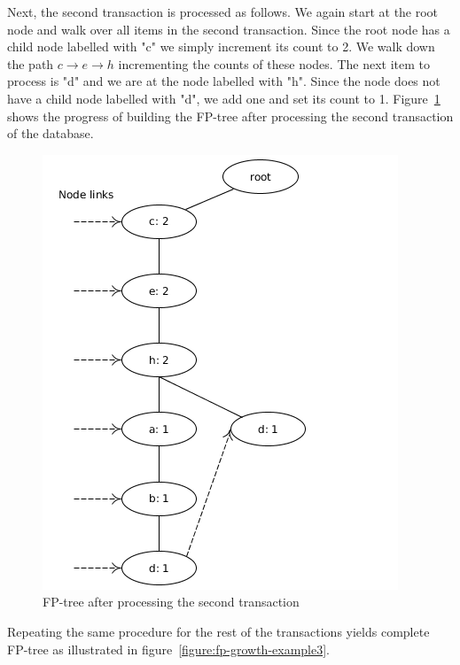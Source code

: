 Next, the second transaction is processed as follows. We again start at the root node and walk over all items in the second transaction. Since the root node has a child node labelled with "c" we simply increment its count to 2. We walk down the path $c \rightarrow e \rightarrow h$ incrementing the counts of these nodes. The next  item to process is "d" and we are at the node labelled with "h". Since the node does not have a child node labelled with "d", we add one and set its count to 1. Figure~\ref{figure:fp-growth-example2} shows the progress of building the FP-tree after processing the second transaction of the database.

\begin{figure}[h]
	\centering
	\includegraphics[scale=0.5]{fp-tree-example/fp-tree-p2.png}
	\caption{FP-tree after processing the second transaction}
	\label{figure:fp-growth-example2}
\end{figure}

Repeating the same procedure for the rest of the transactions yields complete FP-tree as illustrated in figure~\ref{figure:fp-growth-example3}.

